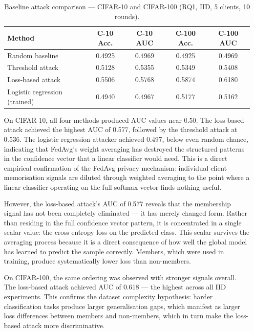 \documentclass[12pt, a4paper]{report}
\begin{document}
\begin{table}[H]
  \centering
  \caption{Baseline attack comparison --- CIFAR-10 and CIFAR-100 (RQ1, IID, 5 clients, 10 rounds).}
  \label{tab:baseline}
  \begin{tabular}{lcccc}
    \toprule
    \textbf{Method} & \textbf{C-10 Acc.} & \textbf{C-10 AUC} & \textbf{C-100 Acc.} & \textbf{C-100 AUC} \\
    \midrule
    Random baseline                    & 0.4925 & 0.4969 & 0.4925 & 0.4969 \\
    Threshold attack                   & 0.5128 & 0.5355 & 0.5349 & 0.5408 \\
    Loss-based attack                  & 0.5506 & 0.5768 & 0.5874 & 0.6180 \\
    Logistic regression (trained)      & 0.4940 & 0.4967 & 0.5177 & 0.5162 \\
    \bottomrule
  \end{tabular}
\end{table}

On CIFAR-10, all four methods produced AUC values near 0.50. The loss-based
attack achieved the highest AUC of 0.577, followed by the threshold attack at
0.536. The logistic regression attacker achieved 0.497, below even random chance,
indicating that FedAvg's weight averaging has destroyed the structured patterns
in the confidence vector that a linear classifier would need. This is a direct
empirical confirmation of the FedAvg privacy mechanism: individual client
memorisation signals are diluted through weighted averaging to the point where
a linear classifier operating on the full softmax vector finds nothing useful.

However, the loss-based attack's AUC of 0.577 reveals that the membership signal
has not been completely eliminated --- it has merely changed form. Rather than
residing in the full confidence vector pattern, it is concentrated in a single
scalar value: the cross-entropy loss on the predicted class. This scalar survives
the averaging process because it is a direct consequence of how well the global
model has learned to predict the sample correctly. Members, which were used in
training, produce systematically lower loss than non-members.

On CIFAR-100, the same ordering was observed with stronger signals overall. The
loss-based attack achieved AUC of 0.618 --- the highest across all IID
experiments. This confirms the dataset complexity hypothesis: harder classification
tasks produce larger generalisation gaps, which manifest as larger loss differences
between members and non-members, which in turn make the loss-based attack more
discriminative.
\end{document}

